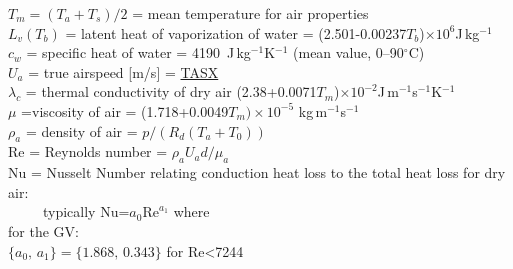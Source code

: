 \documentclass[
]{book}
\begin{document}
\(T_{m}=(T_{a}+T_{s})/2\) = mean temperature for air properties\\
\(L_{v}(T_{b})\) = latent heat of vaporization of water
= (2.501-0.00237\(T_{b}\))\(\times10^{6}\)J\(\,\)kg\(^{-1}\)\\
\(c_{w}\) =
specific heat of water = 4190~J\(\,\)kg\(^{-1}\)K\(^{-1}\) (mean value,
0--90\(^{\circ}\)C)\\
\(U_{a}\) = true airspeed {[}m/s{]} = \href{./4-the-state-of-the-atmosphere.html\#true-airspeed}{TASX}\\
\(\lambda_{c}\)
= thermal conductivity
of dry air (2.38+0.0071\(T_{m}\))\(\times10^{-2}\)J\(\,\)m\(^{-1}\)s\(^{-1}\)K\(^{-1}\)\\
\(\mu\)
=viscosity of air = (1.718+0.0049\(T_{m})\times10^{-5}\)
kg\(\,\)m\(^{-1}\)s\(^{-1}\)\\
\(\rho_{a}\) = density
of air = \(p / (R_{d}(T_{a}+T_{0}))\)\\
Re = Reynolds number = \(\rho_{a}U_{a}d/\mu_{a}\)\\
Nu = Nusselt Number relating conduction
heat loss to the total heat loss for dry air:\\
~~~~~typically Nu=\(a_{0}\mathrm{Re}^{a_{1}}\) where\\
\hspace*{0.333em}\hspace*{0.333em}\hspace*{0.333em}\hspace*{0.333em}\hspace*{0.333em}for the GV:\\
\hspace*{0.333em}\hspace*{0.333em}\hspace*{0.333em}\hspace*{0.333em}\hspace*{0.333em}\hspace*{0.333em}\hspace*{0.333em}\hspace*{0.333em}\(\{a_{0},\,a_{1}\}=\{1.868,\,0.343\}\) for Re\textless7244\\
\end{document}
